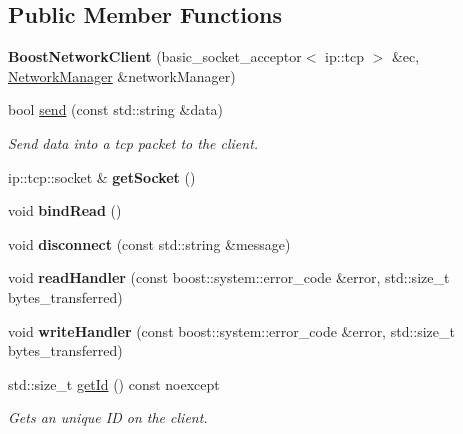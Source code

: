 \subsection*{Public Member Functions}
\begin{DoxyCompactItemize}
\item 
\mbox{\label{classnet_1_1BoostNetworkClient_a832aefb3748593253acdc953c733476e}} 
{\bfseries Boost\+Network\+Client} (basic\+\_\+socket\+\_\+acceptor$<$ ip\+::tcp $>$ \&ec, \hyperlink{classnet_1_1NetworkManager}{Network\+Manager} \&network\+Manager)
\item 
bool \hyperlink{classnet_1_1BoostNetworkClient_af584270d274c31b315eba24effd86b46}{send} (const std\+::string \&data)
\begin{DoxyCompactList}\small\item\em Send \textquotesingle{}data\textquotesingle{} into a tcp packet to the client. \end{DoxyCompactList}\item 
\mbox{\label{classnet_1_1BoostNetworkClient_a50ffb3f1689aebecf724d466894a25d1}} 
ip\+::tcp\+::socket \& {\bfseries get\+Socket} ()
\item 
\mbox{\label{classnet_1_1BoostNetworkClient_ab552e0d494a73e0b6e97e4790642dab5}} 
void {\bfseries bind\+Read} ()
\item 
\mbox{\label{classnet_1_1BoostNetworkClient_a4228d9f794ae8e546e475852bdb495f7}} 
void {\bfseries disconnect} (const std\+::string \&message)
\item 
\mbox{\label{classnet_1_1BoostNetworkClient_aa17822d06f0d13c4dfa44a32c877b31b}} 
void {\bfseries read\+Handler} (const boost\+::system\+::error\+\_\+code \&error, std\+::size\+\_\+t bytes\+\_\+transferred)
\item 
\mbox{\label{classnet_1_1BoostNetworkClient_aea5d66edb8f42881ef279ca09c8e2e15}} 
void {\bfseries write\+Handler} (const boost\+::system\+::error\+\_\+code \&error, std\+::size\+\_\+t bytes\+\_\+transferred)
\item 
\mbox{\label{classnet_1_1BoostNetworkClient_a149fe4688e9854153e4f4bce737f4dfd}} 
std\+::size\+\_\+t \hyperlink{classnet_1_1BoostNetworkClient_a149fe4688e9854153e4f4bce737f4dfd}{get\+Id} () const noexcept
\begin{DoxyCompactList}\small\item\em Gets an unique ID on the client. \end{DoxyCompactList}\end{DoxyCompactItemize}


